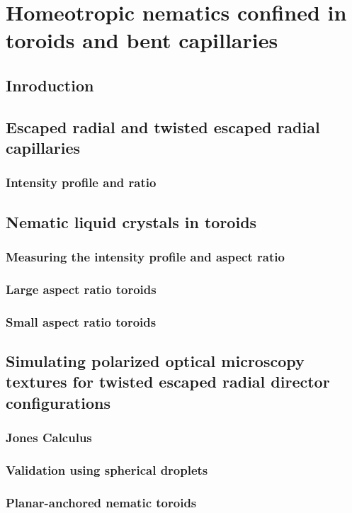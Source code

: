 \chapter{Homeotropic nematics confined in toroids and bent capillaries}

\section{Inroduction}

\section{Escaped radial and twisted escaped radial capillaries}
\subsection{Intensity profile and ratio}


\section{Nematic liquid crystals in toroids}
\subsection{Measuring the intensity profile and aspect ratio}
\subsection{Large aspect ratio toroids}
\subsection{Small aspect ratio toroids}

\section{Simulating polarized optical microscopy textures for twisted escaped radial director configurations}
\subsection{Jones Calculus}
\subsection{Validation using spherical droplets}
\subsection{Planar-anchored nematic toroids}
